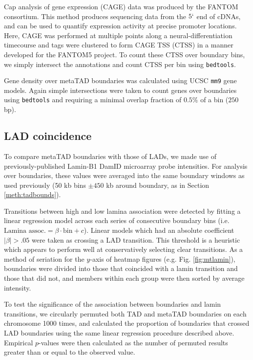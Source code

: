 \documentclass[a4paper,11pt,oneside]{book}
\begin{document}
Cap analysis of gene expression (CAGE) data was produced by the FANTOM consortium.\cite{fantom5, itoh2012a} This method produces sequencing data from the $5`$ end of cDNAs, and can be used to quantify expression activity at precise promoter locations.\cite{Kodzius2006} Here, CAGE was performed at multiple points along a neural-differentiation timecourse and tags were clustered to form CAGE TSS (CTSS) in a manner developed for the FANTOM5 project.\cite{fantom5} To count these CTSS over boundary bins, we simply intersect the annotations and count CTSS per bin using \texttt{bedtools}.\cite{Quinlan2010}

Gene density over metaTAD boundaries was calculated using UCSC \texttt{mm9} gene models.\cite{Karolchik2014} Again simple intersections were taken to count genes over boundaries using \texttt{bedtools}\cite{Quinlan2010} and requiring a minimal overlap fraction of $0.5\%$ of a bin ($250$ bp).

\subsection{LAD coincidence}\label{meth:metalad}

To compare metaTAD boundaries with those of LADs, we made use of previously-published Lamin-B1 DamID microarray probe intensities.\citet{Peric-Hupkes2010} For analysis over boundaries, these values were averaged into the same boundary windows as used previously (50 kb bins $\pm450$ kb around boundary, as in Section \ref{meth:tadbounds}). 

Transitions between high and low lamina association were detected by fitting a linear regression model across each series of consecutive boundary bins (i.e. $\textrm{Lamina assoc.}=\beta\cdot\textrm{bin} + c$). Linear models which had an absolute coefficient $|\beta| >.05$ were taken as crossing a LAD transition. This threshold is a heuristic which appears to perform well at conservatively selecting clear transitions. As a method of seriation for the $y$-axis of heatmap figures (e.g. Fig. \ref{fig:mtlamin}), boundaries were divided into those that coincided with a lamin transition and those that did not, and members within each group were then sorted by average intensity. 

To test the significance of the association between boundaries and lamin transitions, we circularly permuted both TAD and metaTAD boundaries on each chromosome 1000 times, and calculated the proportion of boundaries that crossed LAD boundaries using the same linear regression procedure described above. Empirical $p$-values were then calculated as the number of permuted results greater than or equal to the observed value.
\end{document}
